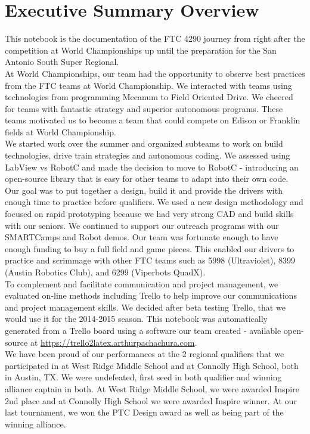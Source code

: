\section{Executive Summary Overview}
This notebook is the documentation of the FTC 4290 journey from right after the competition at World Championships up until the preparation for the San Antonio South Super Regional.\\

At World Championships, our team had the opportunity to observe best practices from the FTC teams at World Championship. We interacted with teams using technologies from programming Mecanum to Field Oriented Drive. We cheered for teams with fantastic strategy and superior autonomous programs. These teams motivated us to become a team that could compete on Edison or Franklin fields at World Championship.\\

We started work over the summer and organized subteams to work on build technologies, drive train strategies and autonomous coding. We assessed using LabView vs RobotC and made the decision to move to RobotC - introducing an open-source library that is easy for other teams to adapt into their own code.  Our goal was to put together a design, build it and provide the drivers with enough time to practice before qualifiers. We used a new design methodology and focused on rapid prototyping because we had very strong CAD and build skills with our seniors. We continued to support our outreach programs with our SMARTCamps and Robot demos. Our team was fortunate enough to have enough funding to buy a full field and game pieces. This enabled our drivers to practice and scrimmage with other FTC teams such as 5998 (Ultraviolet), 8399 (Austin Robotics Club), and 6299 (Viperbots QuadX).\\

To complement and facilitate communication and project management, we evaluated on-line methods including Trello to help improve our communications and project management skills. We decided after beta testing Trello, that we would use it for the 2014-2015 season.  This notebook was automatically generated from a Trello board using a software our team created - available open-source at \url{https://trello2latex.arthurpachachura.com}.\\ 

We have been proud of our performances at the 2 regional qualifiers that we participated in at West Ridge Middle School and at Connolly High School, both in Austin, TX.  We were undefeated, first seed in both qualifier and winning alliance captain in both.  At West Ridge Middle School, we were awarded Inspire 2nd place and at Connolly High School we were awarded Inspire winner.  At our last tournament, we won the PTC Design award as well as being part of the winning alliance.\\

